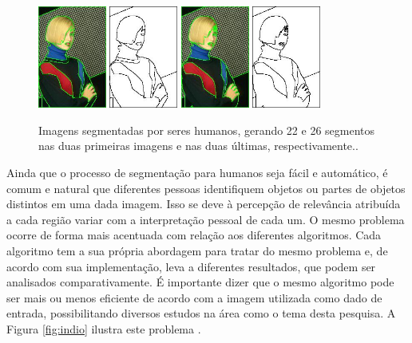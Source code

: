 \begin{figure}[!h]
 \centering
 \def\baselinestretch{1}\small\normalsize
 \includegraphics[width=0.2\textwidth]{img/198023-22-color.jpg}\qquad
 \includegraphics[width=0.2\textwidth]{img/198023-22.jpg}  \qquad
  \includegraphics[width=0.2\textwidth]{img/198023-26-color.jpg}  \qquad
 \includegraphics[width=0.2\textwidth]{img/198023-26.jpg}        
 \caption{\label{fig:Berkeley_mulher_segmentada}Imagens segmentadas por seres humanos, gerando 22 e 26 segmentos nas duas primeiras imagens e nas duas últimas, respectivamente.\citep{Arbelez2011}.}
\end{figure}




Ainda que o processo de segmentação para humanos seja fácil e automático, é comum e natural que diferentes pessoas identifiquem objetos ou partes de objetos distintos em uma dada imagem. Isso se deve à percepção de relevância atribuída a cada região variar com a interpretação pessoal de cada um. 
O mesmo problema ocorre de forma mais acentuada com relação aos diferentes algoritmos. Cada algoritmo tem a sua própria abordagem para tratar do mesmo problema e, de acordo com sua implementação, leva a diferentes resultados, que podem ser analisados comparativamente. É importante dizer que o mesmo algoritmo pode ser mais ou menos eficiente de acordo com a imagem utilizada como dado de entrada, possibilitando diversos estudos na área como o tema desta pesquisa. A Figura \ref{fig:indio} ilustra este problema\citep{berkeley} . 

